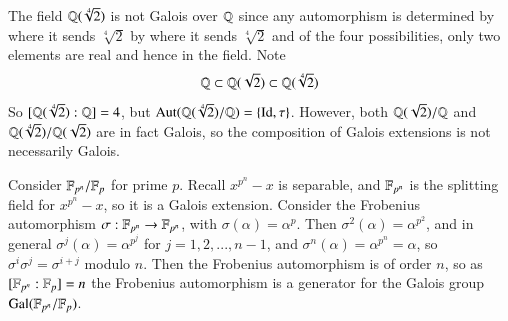 \documentclass[12pt, a4paper, oneside, openright, titlepage]{book}
\begin{document}
\begin{eg}
\begin{center}
    \end{center}
\end{eg}


\begin{eg}
    The field $\mathbb Q(\sqrt[4]{2})$ is not Galois over $\mathbb Q$ since any automorphism is determined by where it sends $\sqrt[4]{2}$ by where it sends $\sqrt[4]{2}$ and of the four possibilities, only two elements are real and hence in the field. Note \begin{equation*}
        \mathbb Q \subset \mathbb Q(\sqrt{2}) \subset \mathbb Q(\sqrt[4]{2})
    \end{equation*}
    So $[\mathbb Q(\sqrt[4]{2}):\mathbb Q] = 4$, but $\operatorname{Aut}(\mathbb Q(\sqrt[4]{2})/\mathbb Q) = \{\operatorname{Id}, \tau\}$. However, both $\mathbb Q(\sqrt{2})/\mathbb Q$ and $\mathbb Q(\sqrt[4]{2})/\mathbb Q(\sqrt{2})$ are in fact Galois, so the composition of Galois extensions is not necessarily Galois.
\end{eg}

\begin{eg}
    Consider $\mathbb F_{p^n}/\mathbb F_p$ for prime $p$. Recall $x^{p^n}-x$ is separable, and $\mathbb F_{p^n}$ is the splitting field for $x^{p^n}-x$, so it is a Galois extension. Consider the Frobenius automorphism $\sigma:\mathbb F_{p^n}\rightarrow \mathbb F_{p^n}$, with $\sigma(\alpha) = \alpha^p$. Then $\sigma^2(\alpha) = \alpha^{p^2}$, and in general $\sigma^j(\alpha) = \alpha^{p^j}$ for $j = 1,2,...,n-1$, and $\sigma^n(\alpha) = \alpha^{p^n} = \alpha$, so $\sigma^i\sigma^j = \sigma^{i+j}$ modulo $n$. Then the Frobenius automorphism is of order $n$, so as $[\mathbb F_{p^n}:\mathbb F_p] = n$ the Frobenius automorphism is a generator for the Galois group $\text{Gal}(\mathbb F_{p^n}/\mathbb F_p)$.
\end{eg}
\end{document}
